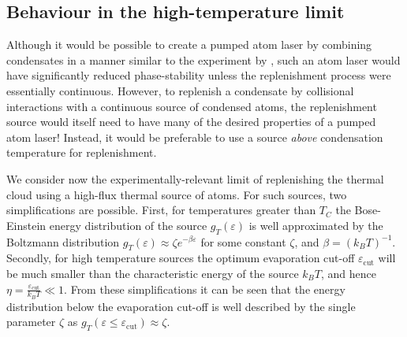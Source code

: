 \subsection{Behaviour in the high-temperature limit}
Although it would be possible to create a pumped atom laser by combining condensates in a manner similar to the experiment by \citet{Chikkatur:2002qa}, such an atom laser would have significantly reduced phase-stability unless the replenishment process were essentially continuous. However, to replenish a condensate by collisional interactions with a continuous source of condensed atoms, the replenishment source would itself need to have many of the desired properties of a pumped atom laser! Instead, it would be preferable to use a source \emph{above} condensation temperature for replenishment.

We consider now the experimentally-relevant limit of replenishing the thermal cloud using a high-flux thermal source of atoms. For such sources, two simplifications are possible. First, for temperatures greater than $T_C$ the Bose-Einstein energy distribution of the source $g_T(\varepsilon)$ is well approximated by the Boltzmann distribution $g_T(\varepsilon) \approx \zeta e^{-\beta \varepsilon}$ for some constant $\zeta$, and $\beta = \left(k_B T\right)^{-1}$. Secondly, for high temperature sources the optimum evaporation cut-off $\varepsilon_\text{cut}$ will be much smaller than the characteristic energy of the source $k_B T$, and hence $\displaystyle \eta = \frac{\varepsilon_\text{cut}}{k_B T} \ll 1$.  From these simplifications it can be seen that the energy distribution below the evaporation cut-off is well described by the single parameter $\zeta$ as $g_T(\varepsilon \leq \varepsilon_\text{cut}) \approx \zeta$.


